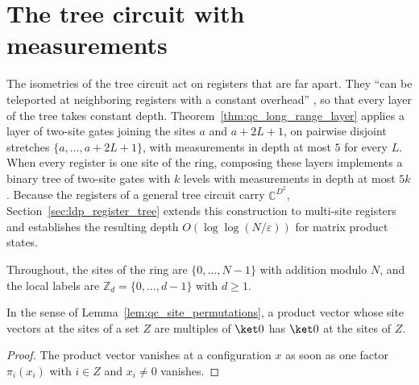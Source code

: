 
\section{The tree circuit with measurements}\label{sec:ldp_tree_measurements}

The isometries of the tree circuit act on registers that are far apart. They
``can be teleported at neighboring registers with a constant overhead''
\cite{Malz2024Preparation}, so that every layer of the tree takes constant
depth. Theorem~\ref{thm:qc_long_range_layer} applies a layer of two-site gates
joining the sites $a$ and $a+2L+1$, on pairwise disjoint stretches
$\{a,\dots,a+2L+1\}$, with measurements in depth at most $5$ for every $L$. When every register is one site of the ring, composing these layers implements a binary tree of two-site gates with $k$ levels
with measurements in depth at most $5k$. Because the registers of a general tree circuit carry $\mathbb C^{D^2}$, Section~\ref{sec:ldp_register_tree} extends this construction to multi-site registers and establishes the resulting depth $O(\log\log(N/\varepsilon))$ for
matrix product states.

Throughout, the sites of the ring are $\{0,\dots,N-1\}$ with addition modulo
$N$, and the local labels are $\mathbb Z_d=\{0,\dots,d-1\}$ with $d\ge1$.

\begin{lemma}
    \label{lem:ldp_zero_sites_product_vector}
    \leanok
    In the sense of Lemma~\ref{lem:qc_site_permutations}, a product vector whose site vectors at the sites of a set $Z$ are multiples
    of $\ket0$ has $\ket0$ at the sites of $Z$.
\end{lemma}
\begin{proof}
    \leanok
    The product vector vanishes at a configuration $x$ as soon as one factor
    $\pi_i(x_i)$ with $i\in Z$ and $x_i\neq0$ vanishes.
\end{proof}

